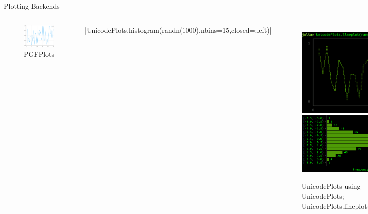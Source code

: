 \documentclass{beamer}
\begin{document}
\begin{frame}[fragile]{Plotting Backends}
\begin{columns}
	\begin{figure}[h]
		\centering
		\includegraphics[width=.75\textwidth]{randPlotPGF}
		\caption{PGFPlots}
	\end{figure}
	\vspace{-11mm}
	|UnicodePlots.histogram(randn(1000),nbins=15,closed=:left)|
	\begin{figure}[h]
		\centering
		\includegraphics[width=.475\textwidth]{randPlotUni0}
		\includegraphics[width=.475\textwidth]{randPlotUni2}
		\caption{
		\centering UnicodePlots\newline 
		\tiny using UnicodePlots; UnicodePlots.lineplot(rand(10))\newline
		\fontsize{5}{5}\selectfont
		\protect{}
		}
	\end{figure}
	\end{columns}
\end{frame}
\end{document}

